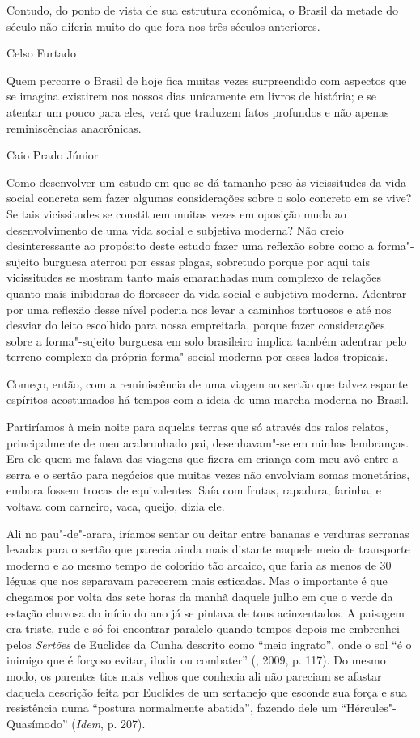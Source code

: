{\epigraph{Contudo, do ponto de vista de sua estrutura econômica, o Brasil da
metade do século  não diferia muito do que fora nos três séculos
anteriores.}{Celso Furtado}

\medskip

\epigraph{Quem percorre o Brasil de hoje fica muitas vezes surpreendido com
aspectos que se imagina existirem nos nossos dias unicamente em livros
de história; e se atentar um pouco para eles, verá que traduzem fatos
profundos e não apenas reminiscências anacrônicas.}{Caio Prado Júnior}


Como desenvolver um estudo em que se dá tamanho peso às vicissitudes da
vida social concreta sem fazer algumas considerações sobre o solo
concreto em se vive? Se tais vicissitudes se constituem muitas vezes em
oposição muda ao desenvolvimento de uma vida social e subjetiva moderna?
Não creio desinteressante ao propósito deste estudo fazer uma reflexão sobre como a
forma"-sujeito burguesa aterrou por essas plagas, sobretudo porque por
aqui tais vicissitudes se mostram tanto mais emaranhadas num complexo de
relações quanto mais inibidoras do florescer da vida social e subjetiva
moderna. Adentrar por uma reflexão desse nível poderia nos levar a
caminhos tortuosos e até nos desviar do leito escolhido para nossa
empreitada, porque fazer considerações sobre a forma"-sujeito burguesa em
solo brasileiro implica também adentrar pelo terreno complexo da própria
forma"-social moderna por esses lados tropicais.

Começo, então, com a reminiscência de uma viagem ao sertão que talvez espante
espíritos acostumados há tempos com a ideia de uma marcha moderna no
Brasil.

Partiríamos à meia noite para aquelas terras que só através dos
ralos relatos, principalmente de meu acabrunhado pai, desenhavam"-se em
minhas lembranças. Era ele quem me falava das viagens que fizera em
criança com meu avô entre a serra e o sertão para negócios que muitas
vezes não envolviam somas monetárias, embora fossem trocas de
equivalentes. Saía com frutas, rapadura, farinha, e voltava com
carneiro, vaca, queijo, dizia ele.

Ali no pau"-de"-arara, iríamos sentar ou deitar entre bananas e verduras
serranas levadas para o sertão que parecia ainda mais distante naquele
meio de transporte moderno e ao mesmo tempo de colorido tão arcaico, que
faria as menos de 30 léguas que nos separavam parecerem mais esticadas.
Mas o importante é que chegamos por volta das sete horas da manhã
daquele julho em que o verde da estação chuvosa do início do ano já se pintava
de tons acinzentados. A paisagem era triste, rude e só foi encontrar paralelo
quando tempos depois me embrenhei pelos \emph{Sertões} de Euclides da
Cunha descrito como ``meio ingrato'', onde o sol ``é o inimigo que é
forçoso evitar, iludir ou combater'' (, 2009, p. 117). Do mesmo
modo, os parentes tios mais velhos que conhecia ali não pareciam se
afastar daquela descrição feita por Euclides de um sertanejo que esconde
sua força e sua resistência numa ``postura normalmente abatida'',
fazendo dele um ``Hércules"-Quasímodo'' (\emph{Idem}, p. 207).

}
